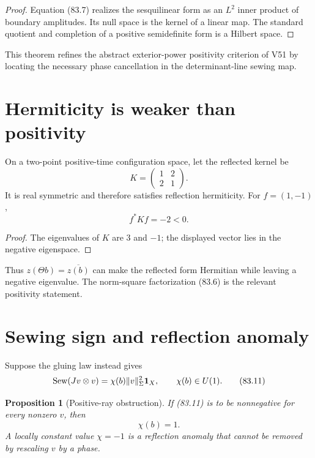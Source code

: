 \documentclass[11pt]{article}
\newtheorem{proposition}[theorem]{Proposition}
\theoremstyle{remark}
\begin{document}
\begin{proof}
Equation (83.7) realizes the sesquilinear form as an \(L^2\) inner
product of boundary amplitudes.  Its null space is the kernel of a
linear map.  The standard quotient and completion of a positive
semidefinite form is a Hilbert space.
\end{proof}

This theorem refines the abstract exterior-power positivity
criterion of V51 by locating the necessary phase cancellation in
the determinant-line sewing map.

\section{Hermiticity is weaker than positivity}

\begin{counterexample}
\label{cnt:v15v83-hermitian}
On a two-point positive-time configuration space, let the reflected
kernel be
\[
 K=
 \begin{pmatrix}
 1&2\\
 2&1
 \end{pmatrix}.                                      \tag{83.9}
\]
It is real symmetric and therefore satisfies reflection
hermiticity.  For \(f=(1,-1)\),
\[
 f^*Kf=-2<0.                                          \tag{83.10}
\]
\end{counterexample}

\begin{proof}
The eigenvalues of \(K\) are \(3\) and \(-1\); the displayed vector
lies in the negative eigenspace.
\end{proof}

Thus \(z(\Theta b)=\overline{z(b)}\) can make the reflected form
Hermitian while leaving a negative eigenvalue.  The norm-square
factorization (83.6) is the relevant positivity statement.

\section{Sewing sign and reflection anomaly}

Suppose the gluing law instead gives
\[
 {\rm Sew}(Jv\otimes v)
 =
 \chi(b)\|v\|_\Sigma^2{\bf1}_X,\qquad
 \chi(b)\in U(1).                                     \tag{83.11}
\]

\begin{proposition}[Positive-ray obstruction]
\label{prop:v15v83-sign}
If (83.11) is to be nonnegative for every nonzero \(v\), then
\[
 \chi(b)=1.                                           \tag{83.12}
\]
A locally constant value \(\chi=-1\) is a reflection anomaly that
cannot be removed by rescaling \(v\) by a phase.
\end{proposition}
\end{document}
